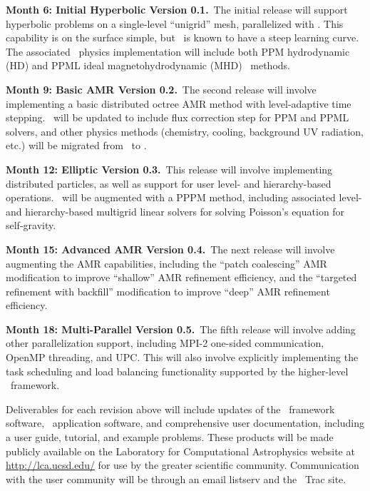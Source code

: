 \documentclass[11pt,letterpaper]{article}
\begin{document}
\textbf{Month 6: Initial Hyperbolic Version 0.1.}~The
initial release will support hyperbolic problems on a single-level
``unigrid'' mesh, parallelized with \charm.  This capability is on the
surface simple, but \charm\ is known to have a steep learning curve.
The associated \enzoii\ physics implementation will include both PPM
hydrodynamic (HD) and PPML ideal magnetohydrodynamic
(MHD)~\cite{UsPo09} methods.

\textbf{Month 9: Basic AMR Version 0.2.}~The second release will involve
implementing a basic distributed octree AMR method with level-adaptive
time stepping.  \enzoii\ will be updated to include flux correction
step for PPM and PPML solvers, and other physics methods (chemistry,
cooling, background UV radiation, etc.) will be
migrated from \enzo\ to \enzoii.

\textbf{Month 12: Elliptic Version 0.3.}~This release will involve
implementing distributed particles, as well as support for user level-
and hierarchy-based operations.  \enzoii\ will be augmented with a
PPPM method, including associated level- and hierarchy-based multigrid
linear solvers for solving Poisson's equation for self-gravity.

\textbf{Month 15: Advanced AMR Version 0.4.}~The next release will
involve augmenting the AMR capabilities, including the ``patch
coalescing'' AMR modification to improve ``shallow'' AMR refinement
efficiency, and the ``targeted refinement with backfill'' modification
to improve ``deep'' AMR refinement efficiency.

\textbf{Month 18: Multi-Parallel Version 0.5.}~The fifth
release will involve adding other parallelization support, including
MPI-2 one-sided communication, OpenMP threading, and UPC.  This will
also involve explicitly implementing the task scheduling and load
balancing functionality supported by the higher-level \charm\
framework.

Deliverables for each revision above will include updates of the
\cello\ framework software, \enzoii\ application software, and
comprehensive user documentation, including a user guide, tutorial,
and example problems.  These products will be made publicly available
on the Laboratory for Computational Astrophysics website at
\url{http://lca.ucsd.edu/} for use by the greater scientific community.
Communication with the user community will be through an email
listserv and the \cello\ Trac site.  
\end{document}
